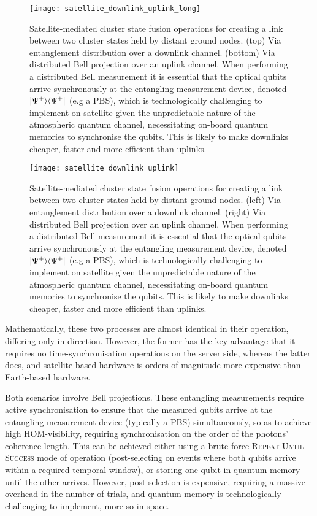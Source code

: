 \pubmode
	\begin{figure}[!htbp]
		\texttt{[image: satellite\_downlink\_uplink\_long]}
		\captionspacefig \caption{Satellite-mediated cluster state fusion operations for creating a link between two cluster states held by distant ground nodes. (top) Via entanglement distribution over a downlink channel. (bottom) Via distributed Bell projection over an uplink channel. When performing a distributed Bell measurement it is essential that the optical qubits arrive synchronously at the entangling measurement device, denoted \mbox{$|\Psi^+\rangle\langle\Psi^+|$} (e.g a PBS), which is technologically challenging to implement on satellite given the unpredictable nature of the atmospheric quantum channel, necessitating on-board quantum memories to synchronise the qubits. This is likely to make downlinks cheaper, faster and more efficient than uplinks.} \label{fig:sat_up_down}
	\end{figure}
\else
	\begin{figure*}[!htbp]
		\texttt{[image: satellite\_downlink\_uplink]}
		\captionspacefig \caption{Satellite-mediated cluster state fusion operations for creating a link between two cluster states held by distant ground nodes. (left) Via entanglement distribution over a downlink channel. (right) Via distributed Bell projection over an uplink channel. When performing a distributed Bell measurement it is essential that the optical qubits arrive synchronously at the entangling measurement device, denoted \mbox{$|\Psi^+\rangle\langle\Psi^+|$} (e.g a PBS), which is technologically challenging to implement on satellite given the unpredictable nature of the atmospheric quantum channel, necessitating on-board quantum memories to synchronise the qubits. This is likely to make downlinks cheaper, faster and more efficient than uplinks.} \label{fig:sat_up_down}
	\end{figure*}
\fi

Mathematically, these two processes are almost identical in their operation, differing only in direction. However, the former has the key advantage that it requires no time-synchronisation operations on the server side, whereas the latter does, and satellite-based hardware is orders of magnitude more expensive than Earth-based hardware.

Both scenarios involve Bell projections. These entangling measurements require active synchronisation to ensure that the measured qubits arrive at the entangling measurement device (typically a PBS) simultaneously, so as to achieve high HOM-visibility, requiring synchronisation on the order of the photons' coherence length. This can be achieved either using a brute-force \textsc{Repeat-Until-Success} mode of operation (post-selecting on events where both qubits arrive within a required temporal window), or storing one qubit in quantum memory until the other arrives. However, post-selection is expensive, requiring a massive overhead in the number of trials, and quantum memory is technologically challenging to implement, more so in space.

